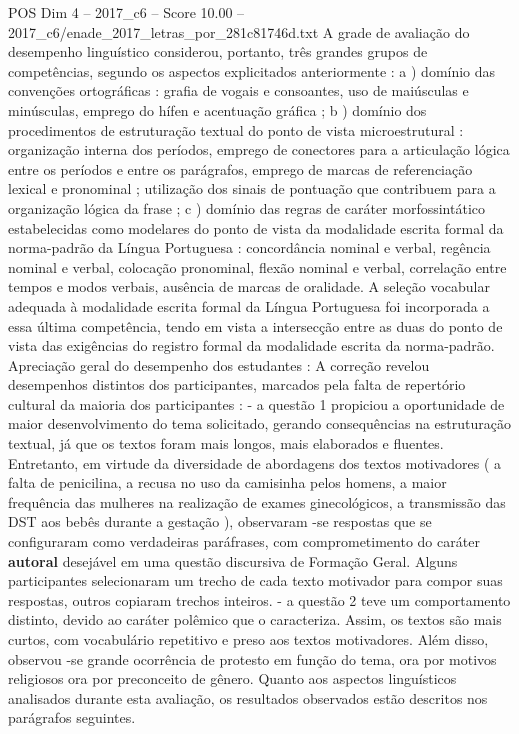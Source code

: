 \begin{textsample}{POS Dim 4 – 2017\_c6 – Score 10.00 – 2017\_c6/enade\_2017\_letras\_por\_281c81746d.txt}
A grade de avaliação do desempenho linguístico considerou, portanto, três grandes grupos de competências, segundo os aspectos explicitados anteriormente : a ) domínio das convenções ortográficas : grafia de vogais e consoantes, uso de maiúsculas e minúsculas, emprego do hífen e acentuação gráfica ; b ) domínio dos procedimentos de estruturação textual do ponto de vista microestrutural : organização interna dos períodos, emprego de conectores para a articulação lógica entre os períodos e entre os parágrafos, emprego de marcas de referenciação lexical e pronominal ; utilização dos sinais de pontuação que contribuem para a organização lógica da frase ; c ) domínio das regras de caráter morfossintático estabelecidas como modelares do ponto de vista da modalidade escrita formal da norma-padrão da Língua Portuguesa : concordância nominal e verbal, regência nominal e verbal, colocação pronominal, flexão nominal e verbal, correlação entre tempos e modos verbais, ausência de marcas de oralidade.
A seleção vocabular adequada à modalidade escrita formal da Língua Portuguesa foi incorporada a essa última competência, tendo em vista a intersecção entre as duas do ponto de vista das exigências do registro formal da modalidade escrita da norma-padrão.
Apreciação geral do desempenho dos estudantes : A correção revelou desempenhos distintos dos participantes, marcados pela falta de repertório cultural da maioria dos participantes : - a questão 1 propiciou a oportunidade de maior desenvolvimento do tema solicitado, gerando consequências na estruturação textual, já que os textos foram mais longos, mais elaborados e fluentes.
Entretanto, em virtude da diversidade de abordagens dos textos motivadores ( a falta de penicilina, a recusa no uso da camisinha pelos homens, a maior frequência das mulheres na realização de exames ginecológicos, a transmissão das DST aos bebês durante a gestação ), observaram -se respostas que se configuraram como verdadeiras paráfrases, com comprometimento do caráter \textbf{autoral} desejável em uma questão discursiva de Formação Geral.
Alguns participantes selecionaram um trecho de cada texto motivador para compor suas respostas, outros copiaram trechos inteiros. - a questão 2 teve um comportamento distinto, devido ao caráter polêmico que o caracteriza.
Assim, os textos são mais curtos, com vocabulário repetitivo e preso aos textos motivadores.
Além disso, observou -se grande ocorrência de protesto em função do tema, ora por motivos religiosos ora por preconceito de gênero.
Quanto aos aspectos linguísticos analisados durante esta avaliação, os resultados observados estão descritos nos parágrafos seguintes.

\end{textsample}
